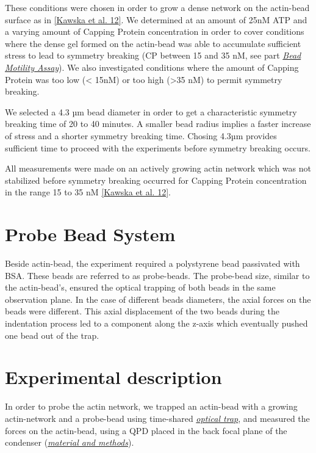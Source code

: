 \documentclass[A4paperpaper,11pt,english]{sphinxmanual}
\begin{document}
These conditions were chosen in order to grow a dense network on the actin-bead surface as in {\hyperref[parts/part3:kawska2012]{{[}Kawska et al. 12{]}}}. We determined at an amount of 25nM ATP and a varying
amount of Capping Protein concentration in order to cover conditions where the
dense gel formed on the actin-bead was able to accumulate sufficient stress
to lead to symmetry breaking (CP between 15  and 35 nM, see part {\hyperref[parts/part1:bead-motility-assay]{\emph{Bead Motility Assay}}}). We also investigated
conditions where the amount of Capping Protein was too low (\textless{} 15nM) or too high
(\textgreater{}35 nM) to permit symmetry breaking.

We selected a 4.3 µm bead diameter in order to get a characteristic symmetry
breaking time of 20 to 40 minutes.
A smaller bead radius implies a
faster increase of stress and a shorter symmetry breaking time.
Chosing 4.3µm provides sufficient time to proceed with the
experiments before symmetry breaking occurs.

All measurements were made on an actively growing actin network which
was not stabilized before symmetry breaking
occurred for Capping Protein concentration in the range 15 to 35 nM {\hyperref[parts/part3:kawska2012]{{[}Kawska et al. 12{]}}}.


\section{Probe Bead System}
\label{parts/part3:probe-bead-system}
Beside actin-bead, the experiment required a polystyrene bead passivated
with BSA. These beads are referred to as probe-beads.  The probe-bead size, similar to the actin-bead’s, ensured the optical
trapping of both beads in the same observation plane. In the case of different beads diameters, the axial forces on the beads were different. This axial
displacement of the two beads during the indentation process led to a
component along the z-axis which  eventually pushed one bead out of the trap.


\section{Experimental description}
\label{parts/part3:experimental-description}
In order to probe the actin network, we trapped an actin-bead with a growing actin-network
and a probe-bead using time-shared {\hyperref[parts/part2:time-shared-ot]{\emph{optical trap}}},  and
measured the forces on the actin-bead, using a QPD placed in the back focal plane of
the condenser ({\hyperref[parts/part2:m-et-m]{\emph{material and methods}}}).
\end{document}
